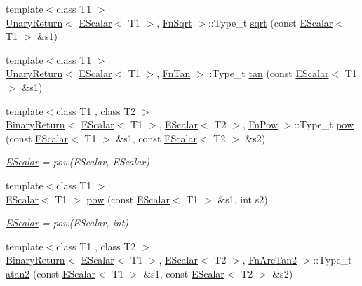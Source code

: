 \begin{DoxyCompactItemize}
\item 
{\footnotesize template$<$class T1 $>$ }\\\mbox{\hyperlink{structENSEM_1_1UnaryReturn}{Unary\+Return}}$<$ \mbox{\hyperlink{classENSEM_1_1EScalar}{E\+Scalar}}$<$ T1 $>$, \mbox{\hyperlink{structENSEM_1_1FnSqrt}{Fn\+Sqrt}} $>$\+::Type\+\_\+t \mbox{\hyperlink{group__escalar_ga4e0889a609d84d3ddac113e68bfccfa4}{sqrt}} (const \mbox{\hyperlink{classENSEM_1_1EScalar}{E\+Scalar}}$<$ T1 $>$ \&s1)
\item 
{\footnotesize template$<$class T1 $>$ }\\\mbox{\hyperlink{structENSEM_1_1UnaryReturn}{Unary\+Return}}$<$ \mbox{\hyperlink{classENSEM_1_1EScalar}{E\+Scalar}}$<$ T1 $>$, \mbox{\hyperlink{structENSEM_1_1FnTan}{Fn\+Tan}} $>$\+::Type\+\_\+t \mbox{\hyperlink{group__escalar_ga560632c018611046a7009dc56681b77d}{tan}} (const \mbox{\hyperlink{classENSEM_1_1EScalar}{E\+Scalar}}$<$ T1 $>$ \&s1)
\item 
{\footnotesize template$<$class T1 , class T2 $>$ }\\\mbox{\hyperlink{structENSEM_1_1BinaryReturn}{Binary\+Return}}$<$ \mbox{\hyperlink{classENSEM_1_1EScalar}{E\+Scalar}}$<$ T1 $>$, \mbox{\hyperlink{classENSEM_1_1EScalar}{E\+Scalar}}$<$ T2 $>$, \mbox{\hyperlink{structENSEM_1_1FnPow}{Fn\+Pow}} $>$\+::Type\+\_\+t \mbox{\hyperlink{group__escalar_gaa3f8d5129f1ded089d42af89bd94827d}{pow}} (const \mbox{\hyperlink{classENSEM_1_1EScalar}{E\+Scalar}}$<$ T1 $>$ \&s1, const \mbox{\hyperlink{classENSEM_1_1EScalar}{E\+Scalar}}$<$ T2 $>$ \&s2)
\begin{DoxyCompactList}\small\item\em \mbox{\hyperlink{classENSEM_1_1EScalar}{E\+Scalar}} = pow(\+E\+Scalar, E\+Scalar) \end{DoxyCompactList}\item 
{\footnotesize template$<$class T1 $>$ }\\\mbox{\hyperlink{classENSEM_1_1EScalar}{E\+Scalar}}$<$ T1 $>$ \mbox{\hyperlink{group__escalar_gaba7571beee718548316367ab8d623e70}{pow}} (const \mbox{\hyperlink{classENSEM_1_1EScalar}{E\+Scalar}}$<$ T1 $>$ \&s1, int s2)
\begin{DoxyCompactList}\small\item\em \mbox{\hyperlink{classENSEM_1_1EScalar}{E\+Scalar}} = pow(\+E\+Scalar, int) \end{DoxyCompactList}\item 
{\footnotesize template$<$class T1 , class T2 $>$ }\\\mbox{\hyperlink{structENSEM_1_1BinaryReturn}{Binary\+Return}}$<$ \mbox{\hyperlink{classENSEM_1_1EScalar}{E\+Scalar}}$<$ T1 $>$, \mbox{\hyperlink{classENSEM_1_1EScalar}{E\+Scalar}}$<$ T2 $>$, \mbox{\hyperlink{structENSEM_1_1FnArcTan2}{Fn\+Arc\+Tan2}} $>$\+::Type\+\_\+t \mbox{\hyperlink{group__escalar_ga9a9d48948d119981259ad0ebcb0acfea}{atan2}} (const \mbox{\hyperlink{classENSEM_1_1EScalar}{E\+Scalar}}$<$ T1 $>$ \&s1, const \mbox{\hyperlink{classENSEM_1_1EScalar}{E\+Scalar}}$<$ T2 $>$ \&s2)

\end{DoxyCompactItemize}
